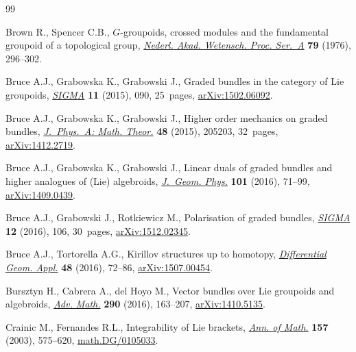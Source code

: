\begin{thebibliography}{99}
\footnotesize\itemsep=0pt

Brown R., Spencer C.B., {$G$}-groupoids, crossed modules and the fundamental
 groupoid of a topological group, \href{https://doi.org/10.1016/1385-7258(76)90068-8}{\textit{Nederl. Akad. Wetensch. Proc.
 Ser.~A}} \textbf{79} (1976), 296--302.

Bruce A.J., Grabowska K., Grabowski J., Graded bundles in the category of {L}ie
 groupoids, \href{https://doi.org/10.3842/SIGMA.2015.090}{\textit{SIGMA}} \textbf{11} (2015), 090, 25~pages,
 \href{https://arxiv.org/abs/1502.06092}{arXiv:1502.06092}.

Bruce A.J., Grabowska K., Grabowski J., Higher order mechanics on graded
 bundles, \href{https://doi.org/10.1088/1751-8113/48/20/205203}{\textit{J.~Phys.~A: Math. Theor.}} \textbf{48} (2015), 205203,
 32~pages, \href{https://arxiv.org/abs/1412.2719}{arXiv:1412.2719}.

Bruce A.J., Grabowska K., Grabowski J., Linear duals of graded bundles and
 higher analogues of ({L}ie) algebroids, \href{https://doi.org/10.1016/j.geomphys.2015.12.004}{\textit{J.~Geom. Phys.}} \textbf{101}
 (2016), 71--99, \href{https://arxiv.org/abs/1409.0439}{arXiv:1409.0439}.

Bruce A.J., Grabowski J., Rotkiewicz M., Polarisation of graded bundles,
 \href{https://doi.org/10.3842/SIGMA.2016.106}{\textit{SIGMA}} \textbf{12} (2016), 106, 30~pages, \href{https://arxiv.org/abs/1512.02345}{arXiv:1512.02345}.

Bruce A.J., Tortorella A.G., Kirillov structures up to homotopy,
 \href{https://doi.org/10.1016/j.difgeo.2016.06.005}{\textit{Differential Geom. Appl.}} \textbf{48} (2016), 72--86,
 \href{https://arxiv.org/abs/1507.00454}{arXiv:1507.00454}.

Bursztyn H., Cabrera A., del Hoyo M., Vector bundles over {L}ie groupoids and
 algebroids, \href{https://doi.org/10.1016/j.aim.2015.11.044}{\textit{Adv. Math.}} \textbf{290} (2016), 163--207,
 \href{https://arxiv.org/abs/1410.5135}{arXiv:1410.5135}.

Crainic M., Fernandes R.L., Integrability of {L}ie brackets, \href{https://doi.org/10.4007/annals.2003.157.575}{\textit{Ann. of
 Math.}} \textbf{157} (2003), 575--620, \href{https://arxiv.org/abs/math.DG/0105033}{math.DG/0105033}.


\end{thebibliography}
